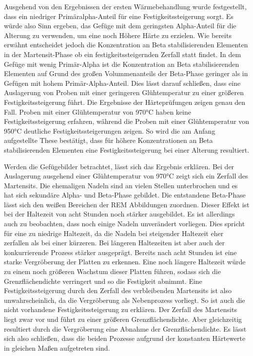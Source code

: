\documentclass[a4paper, 11pt]{tubsreprt}
\begin{document}
Ausgehend von den Ergebnissen der ersten Wärmebehandlung wurde festgestellt, dass ein niedriger Primäralpha-Anteil für eine Festigkeitssteigerung sorgt. Es würde also Sinn ergeben, das Gefüge mit dem geringsten Alpha-Anteil für die Alterung zu verwenden, um eine noch Höhere Härte zu erzielen. Wie bereits erwähnt entscheidet jedoch die Konzentration an Beta stabilisierenden Elementen in der Martensit-Phase ob ein festigkeitssteigernden Zerfall statt findet. In dem Gefüge mit wenig Primär-Alpha ist die Konzentration an Beta stabilisierenden Elementen auf Grund des großen Volummenanteils der Beta-Phase geringer als in Gefügen mit hohem Primär-Alpha-Anteil. Dies lässt darauf schließen, dass eine Auslagerung von Proben mit einer geringeren Glühtemperatur zu einer größeren Festigkeitssteigerung führt. Die Ergebnisse der Härteprüfungen zeigen genau den Fall. Proben mit einer Glühtemperatur von 970°C haben keine Festigkeitssteigerung erfahren, während die Proben mit einer Glühtemperatur von 950°C deutliche Festigkeitssteigerungen zeigen. So wird die am Anfang aufgestellte These bestätigt, dass für höhere Konzentrationen an Beta stabilisierenden Elementen eine Festigkeitssteigerung bei einer Alterung resultiert. 

Werden die Gefügebilder betrachtet, lässt sich das Ergebnis erklären. Bei der Auslagerung ausgehend einer Glühtemperatur von 970°C zeigt sich ein Zerfall des Martensits. Die ehemaligen Nadeln sind an vielen Stellen unterbrochen und es hat sich sekundäre Alpha- und Beta-Phase gebildet. Die entstandene Beta-Phase lässt sich den weißen Bereichen der REM Abbildungen zuordnen. Dieser Effekt ist bei der Haltezeit von acht Stunden noch stärker ausgebildet. Es ist allerdings auch zu beobachten, dass noch einige Nadeln unverändert vorliegen. Dies spricht für eine zu niedrige Haltezeit, da die Nadeln bei steigender Haltezeit eher zerfallen als bei einer kürzeren. Bei längeren Haltezeiten ist aber auch der konkurrierende Prozess stärker ausgeprägt. Bereits nach acht Stunden ist eine starke Vergröberung der Platten zu erkennen. Eine noch längere Haltezeit würde zu einem noch größeren Wachstum dieser Platten führen, sodass sich die Grenzflächendichte verringert und so die Festigkeit abnimmt. Eine Festigkeitssteigerung durch den Zerfall des verbleibenden Martensits ist also unwahrscheinlich, da die Vergröberung als Nebenprozess vorliegt. So ist auch die nicht vorhandene Festigkeitssteigerung zu erklären. Der Zerfall des Martensits liegt zwar vor und führt zu einer größeren Grenzflächendichte. Aber gleichzeitig resultiert durch die Vergröberung eine Abnahme der Grenzflächendichte. Es lässt sich also schließen, dass die beiden Prozesse aufgrund der konstanten Härtewerte in gleichen Maßen aufgetreten sind. 
\end{document}
